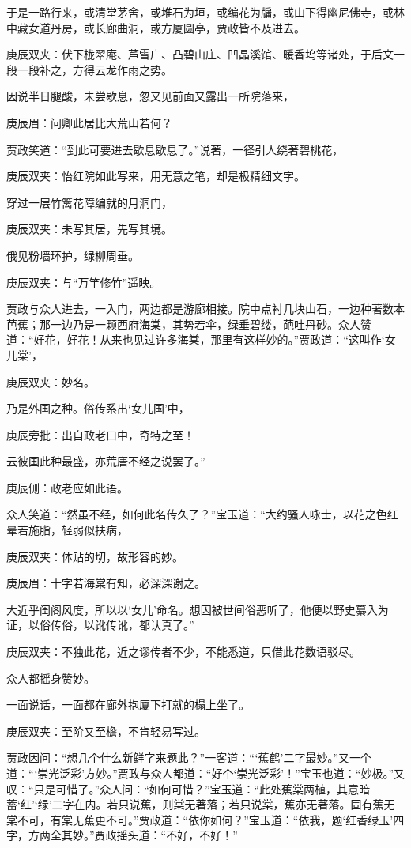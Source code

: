 \begin{parag}
    于是一路行来，或清堂茅舍，或堆石为垣，或编花为牖，或山下得幽尼佛寺，或林中藏女道丹房，或长廊曲洞，或方厦圆亭，贾政皆不及进去。\begin{note}庚辰双夹：伏下栊翠庵、芦雪广、凸碧山庄、凹晶溪馆、暖香坞等诸处，于后文一段一段补之，方得云龙作雨之势。\end{note}因说半日腿酸，未尝歇息，忽又见前面又露出一所院落来，\begin{note}庚辰眉：问卿此居比大荒山若何？\end{note}贾政笑道：“到此可要进去歇息歇息了。”说著，一径引人绕著碧桃花，\begin{note}庚辰双夹：怡红院如此写来，用无意之笔，却是极精细文字。\end{note}穿过一层竹篱花障编就的月洞门，\begin{note}庚辰双夹：未写其居，先写其境。\end{note}俄见粉墙环护，绿柳周垂。\begin{note}庚辰双夹：与“万竿修竹”遥映。\end{note}贾政与众人进去，一入门，两边都是游廊相接。院中点衬几块山石，一边种著数本芭蕉；那一边乃是一颗西府海棠，其势若伞，绿垂碧缕，葩吐丹砂。众人赞道：“好花，好花！从来也见过许多海棠，那里有这样妙的。”贾政道：“这叫作‘女儿棠’，\begin{note}庚辰双夹：妙名。\end{note}乃是外国之种。俗传系出‘女儿国’中，\begin{note}庚辰旁批：出自政老口中，奇特之至！\end{note}云彼国此种最盛，亦荒唐不经之说罢了。”\begin{note}庚辰侧：政老应如此语。\end{note}众人笑道：“然虽不经，如何此名传久了？”宝玉道：“大约骚人咏士，以花之色红晕若施脂，轻弱似扶病，\begin{note}庚辰双夹：体贴的切，故形容的妙。\end{note}\begin{note}庚辰眉：十字若海棠有知，必深深谢之。\end{note}大近乎闺阁风度，所以以‘女儿’命名。想因被世间俗恶听了，他便以野史纂入为证，以俗传俗，以讹传讹，都认真了。”\begin{note}庚辰双夹：不独此花，近之谬传者不少，不能悉道，只借此花数语驳尽。\end{note}众人都摇身赞妙。
\end{parag}


\begin{parag}
    一面说话，一面都在廊外抱厦下打就的榻上坐了。\begin{note}庚辰双夹：至阶又至檐，不肯轻易写过。\end{note}贾政因问：“想几个什么新鲜字来题此？”一客道：“‘蕉鹤’二字最妙。”又一个道：“‘崇光泛彩’方妙。”贾政与众人都道：“好个‘崇光泛彩’！”宝玉也道：“妙极。”又叹：“只是可惜了。”众人问：“如何可惜？”宝玉道：“此处蕉棠两植，其意暗蓄‘红’‘绿’二字在内。若只说蕉，则棠无著落；若只说棠，蕉亦无著落。固有蕉无棠不可，有棠无蕉更不可。”贾政道：“依你如何？”宝玉道：“依我，题‘红香绿玉’四字，方两全其妙。”贾政摇头道：“不好，不好！”
\end{parag}


